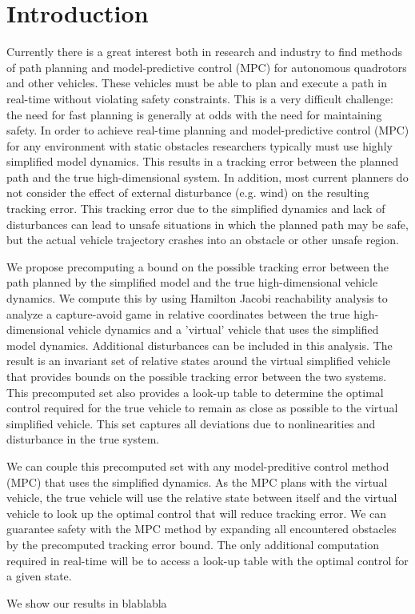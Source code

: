 \section{Introduction}
 Currently there is a great interest both in research and industry to find methods of path planning and model-predictive control (MPC) for autonomous quadrotors and other vehicles.  These vehicles must be able to plan and execute a path in real-time without violating safety constraints. This is a very difficult challenge: the need for fast planning is generally at odds with the need for maintaining safety. In order to achieve real-time planning and model-predictive control (MPC) for any environment with static obstacles researchers typically must use highly simplified model dynamics. This results in a tracking error between the planned path and the true high-dimensional system. In addition, most current planners do not consider the effect of external disturbance (e.g. wind) on the resulting tracking error. This tracking error due to the simplified dynamics and lack of disturbances can lead to unsafe situations in which the planned path may be safe, but the actual vehicle trajectory crashes into an obstacle or other unsafe region.

We propose precomputing a bound on the possible tracking error between the path planned by the simplified model and the true high-dimensional vehicle dynamics. We compute this by using Hamilton Jacobi reachability analysis to analyze a capture-avoid game in relative coordinates between the true high-dimensional vehicle dynamics and a 'virtual' vehicle that uses the simplified model dynamics. Additional disturbances can be included in this analysis. The result is an invariant set of relative states around the virtual simplified vehicle that provides bounds on the possible tracking error between the two systems. This precomputed set also provides a look-up table to determine the optimal control required for the true vehicle to remain as close as possible to the virtual simplified vehicle. This set captures all deviations due to nonlinearities and disturbance in the true system.

We can couple this precomputed set with any model-preditive control method (MPC) that uses the simplified dynamics. As the MPC plans with the virtual vehicle, the true vehicle will use the relative state between itself and the virtual vehicle to look up the optimal control that will reduce tracking error. We can guarantee safety with the MPC method by expanding all encountered obstacles by the precomputed tracking error bound. The only additional computation required in real-time will be to access a look-up table with the optimal control for a given state.

We show our results in blablabla